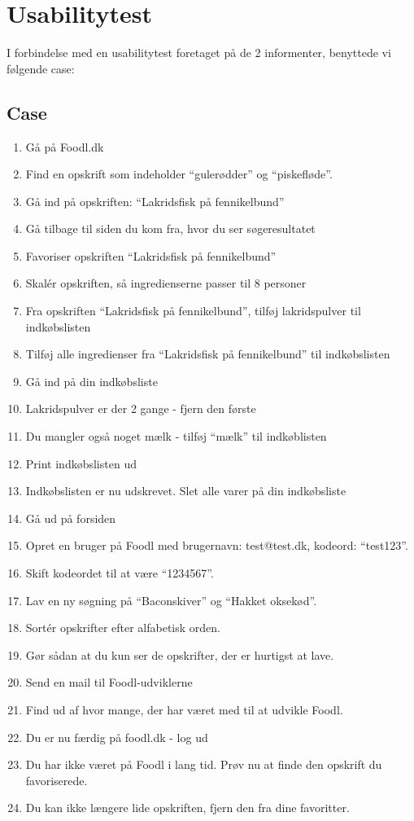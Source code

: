 \chapter{Usabilitytest}
\label{ap:usabilitytest}

I forbindelse med en usabilitytest foretaget på de 2 informenter, benyttede vi følgende case:

\section{Case}
\begin{enumerate}
\item Gå på Foodl.dk
\item Find en opskrift som indeholder ``gulerødder'' og ``piskefløde''.
\item Gå ind på opskriften: ``Lakridsfisk på fennikelbund''
\item Gå tilbage til siden du kom fra, hvor du ser søgeresultatet
\item Favoriser opskriften ``Lakridsfisk på fennikelbund''
\item Skalér opskriften, så ingredienserne passer til 8 personer
\item Fra opskriften ``Lakridsfisk på fennikelbund'', tilføj lakridspulver til indkøbslisten
\item Tilføj alle ingredienser fra ``Lakridsfisk på fennikelbund'' til indkøbslisten
\item Gå ind på din indkøbsliste
\item Lakridspulver er der 2 gange - fjern den første
\item Du mangler også noget mælk - tilføj ``mælk'' til indkøblisten
\item Print indkøbslisten ud
\item Indkøbslisten er nu udskrevet. Slet alle varer på din indkøbsliste
\item Gå ud på forsiden
\item Opret en bruger på Foodl med brugernavn: test@test.dk, kodeord: ``test123''.
\item Skift kodeordet til at være “1234567”.
\item Lav en ny søgning på ``Baconskiver'' og ``Hakket oksekød''.
\item Sortér opskrifter efter alfabetisk orden.
\item Gør sådan at du kun ser de opskrifter, der er hurtigst at lave.
\item Send en mail til Foodl-udviklerne
\item Find ud af hvor mange, der har været med til at udvikle Foodl.
\item Du er nu færdig på foodl.dk - log ud
\item Du har ikke været på Foodl i lang tid. Prøv nu at finde den opskrift du favoriserede.
\item Du kan ikke længere lide opskriften, fjern den fra dine favoritter.
\end{enumerate}
